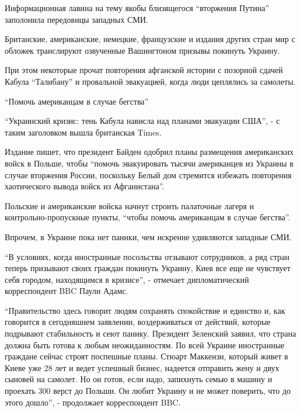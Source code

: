 \raggedcolumns
\begin{multicols}{3} %
\setlength{\parindent}{0pt}

Информационная лавина на тему якобы близящегося \enquote{вторжения Путина} заполонила
передовицы западных СМИ.

Британские, американские, немецкие, французские и издания других стран мир с
обложек транслируют озвученные Вашингтоном призывы покинуть Украину.  

При этом некоторые прочат повторения афганской истории с позорной сдачей Кабула
\enquote{Талибану} и провальной эвакуацией, когда люди цеплялись за самолеты.


\enquote{Помочь американцам в случае бегства}

\enquote{Украинский кризис: тень Кабула нависла над планами эвакуации США}, - с таким заголовком вышла британская Times. 

Издание пишет, что президент Байден одобрил планы размещения американских войск
в Польше, чтобы \enquote{помочь эвакуировать тысячи американцев из Украины в
случае вторжения России, поскольку Белый дом стремится избежать повторения
хаотического вывода войск из Афганистана}. 

Польские и американские войска начнут строить палаточные лагеря и
контрольно-пропускные пункты, \enquote{чтобы помочь американцам в случае
бегства}.

Впрочем, в Украине пока нет паники, чем искренне удивляются западные СМИ.

\enquote{В условиях, когда иностранные посольства отзывают сотрудников, а ряд
стран теперь призывают своих граждан покинуть Украину, Киев все еще не
чувствует себя городом, находящимся в кризисе}, - отмечает дипломатический
корреспондент BBC Паули Адамс.


\enquote{Правительство здесь говорит людям сохранять спокойствие и единство и, как
говорится в сегодняшнем заявлении, воздерживаться от действий, которые
подрывают стабильность и сеют панику. Президент Зеленский заявил, что страна
должна быть готова к любым неожиданностям. По всей Украине иностранные граждане
сейчас строят поспешные планы. Стюарт Маккензи, который живет в Киеве уже 28
лет и ведет успешный бизнес, надеется отправить жену и двух сыновей на самолет.
Но он готов, если надо, запихнуть семью в машину и проехать 300 верст до
Польши. Он любит Украину и не может поверить, что до этого дошло}, - продолжает
корреспондент BBC.


\end{multicols}
